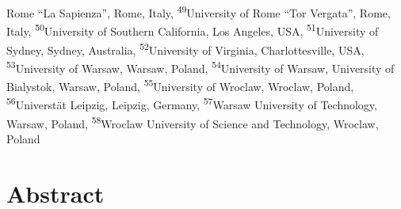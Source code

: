 \documentclass[
]{article}
\begin{document}
Rome ``La Sapienza'', Rome, Italy, \textsuperscript{49}University of Rome ``Tor Vergata'', Rome, Italy, \textsuperscript{50}University of Southern California, Los Angeles, USA, \textsuperscript{51}University of Sydney, Sydney, Australia, \textsuperscript{52}University of Virginia, Charlottesville, USA, \textsuperscript{53}University of Warsaw, Warsaw, Poland, \textsuperscript{54}University of Warsaw, University of Bialystok, Warsaw, Poland, \textsuperscript{55}University of Wroclaw, Wroclaw, Poland, \textsuperscript{56}Universtät Leipzig, Leipzig, Germany, \textsuperscript{57}Warsaw University of Technology, Warsaw, Poland, \textsuperscript{58}Wroclaw University of Science and Technology, Wroclaw, Poland

\hypertarget{abstract}{%
\section{Abstract}\label{abstract}}
\end{document}
